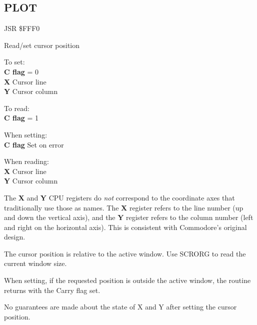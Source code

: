 \subsection{PLOT}
\label{KERNAL Jump Table!PLOT}
\begin{description}[leftmargin=2cm,style=nextline]
    \item [Address:] JSR \$FFF0
    \item [Description:] Read/set cursor position
    \item [Inputs:]
        To set: \\
        \textbf{C flag} = 0 \\
        \textbf{X} Cursor line \\
        \textbf{Y} Cursor column

        To read: \\
        \textbf{C flag} = 1
    \item [Outputs:]
        When setting: \\
        \textbf{C flag} Set on error

        When reading: \\
        \textbf{X} Cursor line \\
        \textbf{Y} Cursor column
    \item [Remarks:]
        The \textbf{X} and \textbf{Y} CPU registers do \textit{not} correspond to the coordinate axes that traditionally use those as names. The \textbf{X} register refers to the line number (up and down the vertical axis), and the \textbf{Y} register refers to the column number (left and right on the horizontal axis). This is consistent with Commodore's original design.

        The cursor position is relative to the active window. Use SCRORG to read the current window size.

        When setting, if the requested position is outside the active window, the routine returns with the Carry flag set.

        No guarantees are made about the state of X and Y after setting the cursor position.
    \item [Example:]
\end{description}


